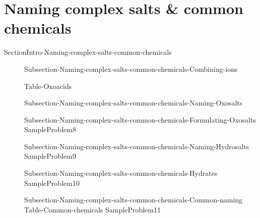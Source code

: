 \documentclass[main.tex]{subfiles}
\begin{document}
\section{Naming complex salts  \& common chemicals}
{SectionIntro-Naming-complex-salts-common-chemicals}
\sloppy \begin{description}
\item[] {Subsection-Naming-complex-salts-common-chemicals-Combining-ions}
\begin{center} {Table-Oxoacids}\end{center}
\item[]{Subsection-Naming-complex-salts-common-chemicals-Naming-Oxosalts}
\item[] {Subsection-Naming-complex-salts-common-chemicals-Formulating-Oxosalts}
{SampleProblem8}

\item[] {Subsection-Naming-complex-salts-common-chemicals-Naming-Hydrosalts}
{SampleProblem9}
\item[] {Subsection-Naming-complex-salts-common-chemicals-Hydrates}
{SampleProblem10}
\item[] {Subsection-Naming-complex-salts-common-chemicals-Common-naming}
{Table-Common-chemicals}	
 {SampleProblem11}
\end{description}
\end{document}
